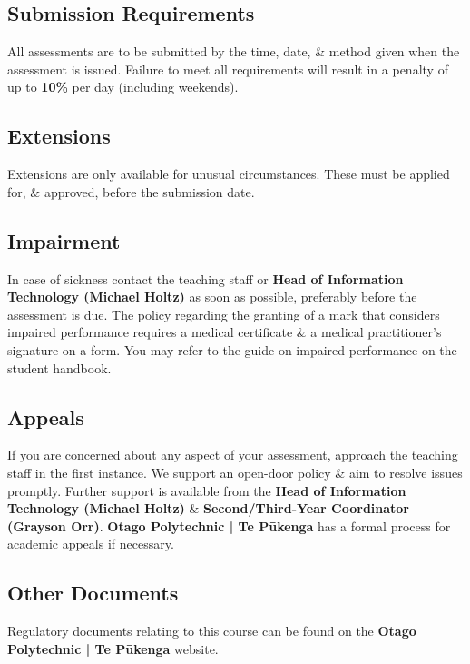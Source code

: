 \documentclass{article}
\begin{document}
\subsection*{Submission Requirements}
All assessments are to be submitted by the time, date, \& method given when the assessment is issued. Failure to meet all requirements will result in a penalty of up to \textbf{10\%} per day (including weekends).

\subsection*{Extensions}
Extensions are only available for unusual circumstances. These must be applied for, \& approved, before the submission date.

\subsection*{Impairment}
In case of sickness contact the teaching staff or \textbf{Head of Information Technology (Michael Holtz)} as soon as possible, preferably before the assessment is due. The policy regarding the granting of a mark that considers impaired performance requires a medical certificate \& a medical practitioner’s signature on a form. You may refer to the guide on impaired performance on the student handbook.

\subsection*{Appeals}
If you are concerned about any aspect of your assessment, approach the teaching staff in the first instance. We support an open-door policy \& aim to resolve issues promptly. Further support is available from the \textbf{Head of Information Technology (Michael Holtz)} \& \textbf{Second/Third-Year Coordinator (Grayson Orr)}. \textbf{Otago Polytechnic | Te Pūkenga} has a formal process for academic appeals if necessary.

\subsection*{Other Documents}
Regulatory documents relating to this course can be found on the \textbf{Otago Polytechnic | Te Pūkenga} website.
\end{document}
